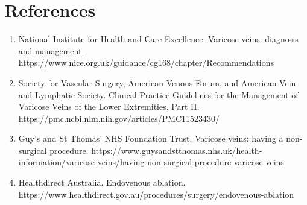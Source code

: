\section*{References}
\begin{enumerate}
  \item National Institute for Health and Care Excellence. Varicose veins: diagnosis and management. https://www.nice.org.uk/guidance/cg168/chapter/Recommendations
  \item Society for Vascular Surgery, American Venous Forum, and American Vein and Lymphatic Society. Clinical Practice Guidelines for the Management of Varicose Veins of the Lower Extremities, Part II. https://pmc.ncbi.nlm.nih.gov/articles/PMC11523430/
  \item Guy's and St Thomas' NHS Foundation Trust. Varicose veins: having a non-surgical procedure. https://www.guysandstthomas.nhs.uk/health-information/varicose-veins/having-non-surgical-procedure-varicose-veins
  \item Healthdirect Australia. Endovenous ablation. https://www.healthdirect.gov.au/procedures/surgery/endovenous-ablation
\end{enumerate}

\clearpage
